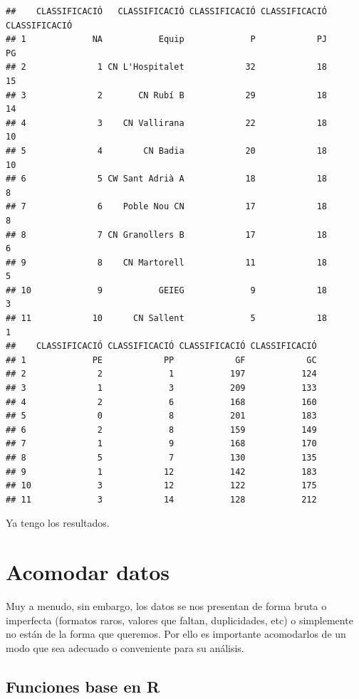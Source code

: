 \documentclass[]{book}
\theoremstyle{definition}
\theoremstyle{definition}
\theoremstyle{remark}
\begin{document}
\begin{verbatim}
##    CLASSIFICACIÓ   CLASSIFICACIÓ CLASSIFICACIÓ CLASSIFICACIÓ CLASSIFICACIÓ
## 1             NA           Equip             P            PJ            PG
## 2              1 CN L'Hospitalet            32            18            15
## 3              2       CN Rubí B            29            18            14
## 4              3    CN Vallirana            22            18            10
## 5              4        CN Badia            20            18            10
## 6              5 CW Sant Adrià A            18            18             8
## 7              6    Poble Nou CN            17            18             8
## 8              7 CN Granollers B            17            18             6
## 9              8    CN Martorell            11            18             5
## 10             9           GEIEG             9            18             3
## 11            10      CN Sallent             5            18             1
##    CLASSIFICACIÓ CLASSIFICACIÓ CLASSIFICACIÓ CLASSIFICACIÓ
## 1             PE            PP            GF            GC
## 2              2             1           197           124
## 3              1             3           209           133
## 4              2             6           168           160
## 5              0             8           201           183
## 6              2             8           159           149
## 7              1             9           168           170
## 8              5             7           130           135
## 9              1            12           142           183
## 10             3            12           122           175
## 11             3            14           128           212
\end{verbatim}

Ya tengo los resultados.

\section{Acomodar datos}\label{acomodar-datos}

Muy a menudo, sin embargo, los datos se nos presentan de forma bruta o
imperfecta (formatos raros, valores que faltan, duplicidades, etc) o
simplemente no están de la forma que queremos. Por ello es importante
acomodarlos de un modo que sea adecuado o conveniente para su análisis.

\subsection{Funciones base en R}\label{funciones-base-en-r}
\end{document}
